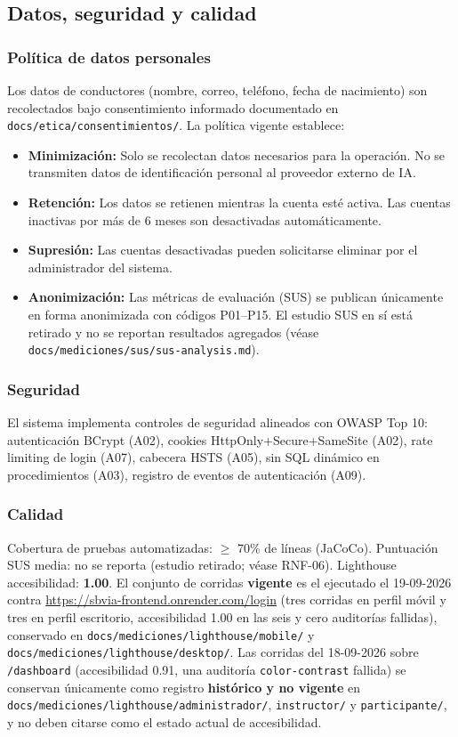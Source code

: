 \documentclass[11pt,a4paper]{article}
\begin{document}
\subsection{Datos, seguridad y calidad}

\subsubsection*{Política de datos personales}
Los datos de conductores (nombre, correo, teléfono, fecha de nacimiento) son recolectados bajo consentimiento informado documentado en \texttt{docs/etica/consentimientos/}. La política vigente establece:
\begin{itemize}[label=\textbf{--}]
    \item \textbf{Minimización:} Solo se recolectan datos necesarios para la operación. No se transmiten datos de identificación personal al proveedor externo de IA.
    \item \textbf{Retención:} Los datos se retienen mientras la cuenta esté activa. Las cuentas inactivas por más de 6 meses son desactivadas automáticamente.
    \item \textbf{Supresión:} Las cuentas desactivadas pueden solicitarse eliminar por el administrador del sistema.
    \item \textbf{Anonimización:} Las métricas de evaluación (SUS) se publican únicamente en forma anonimizada con códigos P01–P15. El estudio SUS en sí está retirado y no se reportan resultados agregados (véase \texttt{docs/mediciones/sus/sus-analysis.md}).
\end{itemize}

\subsubsection*{Seguridad}
El sistema implementa controles de seguridad alineados con OWASP Top 10: autenticación BCrypt (A02), cookies HttpOnly+Secure+SameSite (A02), rate limiting de login (A07), cabecera HSTS (A05), sin SQL dinámico en procedimientos (A03), registro de eventos de autenticación (A09).

\subsubsection*{Calidad}
Cobertura de pruebas automatizadas: $\geq$ 70\% de líneas (JaCoCo). Puntuación SUS media: no se reporta (estudio retirado; véase RNF-06). Lighthouse accesibilidad: \textbf{1.00}. El conjunto de corridas \textbf{vigente} es el ejecutado el 19-09-2026 contra \url{https://sbvia-frontend.onrender.com/login} (tres corridas en perfil móvil y tres en perfil escritorio, accesibilidad 1.00 en las seis y cero auditorías fallidas), conservado en \texttt{docs/mediciones/lighthouse/mobile/} y \texttt{docs/mediciones/lighthouse/desktop/}. Las corridas del 18-09-2026 sobre \texttt{/dashboard} (accesibilidad 0.91, una auditoría \texttt{color-contrast} fallida) se conservan únicamente como registro \textbf{histórico y no vigente} en \texttt{docs/mediciones/lighthouse/administrador/}, \texttt{instructor/} y \texttt{participante/}, y no deben citarse como el estado actual de accesibilidad.
\end{document}
